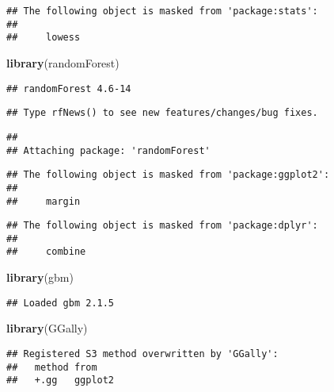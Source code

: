 \documentclass[]{article}
\newenvironment{Shaded}{\begin{snugshade}}{\end{snugshade}}
\newcommand{\KeywordTok}[1]{\textcolor[rgb]{0.13,0.29,0.53}{\textbf{#1}}}
\newcommand{\NormalTok}[1]{#1}
\begin{document}
\begin{verbatim}
## The following object is masked from 'package:stats':
## 
##     lowess
\end{verbatim}

\begin{Shaded}
\begin{Highlighting}[]
\KeywordTok{library}\NormalTok{(randomForest)}
\end{Highlighting}
\end{Shaded}

\begin{verbatim}
## randomForest 4.6-14
\end{verbatim}

\begin{verbatim}
## Type rfNews() to see new features/changes/bug fixes.
\end{verbatim}

\begin{verbatim}
## 
## Attaching package: 'randomForest'
\end{verbatim}

\begin{verbatim}
## The following object is masked from 'package:ggplot2':
## 
##     margin
\end{verbatim}

\begin{verbatim}
## The following object is masked from 'package:dplyr':
## 
##     combine
\end{verbatim}

\begin{Shaded}
\begin{Highlighting}[]
\KeywordTok{library}\NormalTok{(gbm)}
\end{Highlighting}
\end{Shaded}

\begin{verbatim}
## Loaded gbm 2.1.5
\end{verbatim}

\begin{Shaded}
\begin{Highlighting}[]
\KeywordTok{library}\NormalTok{(GGally)}
\end{Highlighting}
\end{Shaded}

\begin{verbatim}
## Registered S3 method overwritten by 'GGally':
##   method from   
##   +.gg   ggplot2
\end{verbatim}
\end{document}

